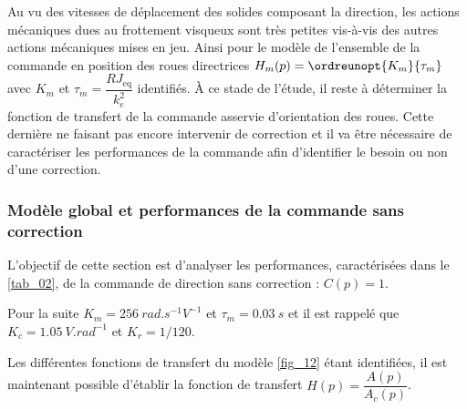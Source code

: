 Au vu des vitesses de déplacement des solides composant la direction, les actions mécaniques dues au frottement
visqueux sont très petites vis-à-vis des autres actions mécaniques mises en jeu. Ainsi pour le modèle de l’ensemble
de la commande en position des roues directrices $H_m(p) = \ordreunopt{K_m}{\tau_m}$ avec $K_m$ et $\tau_m = \dfrac{RJ_{\text{eq}}}{k_e^2}$ identifiés.
À ce stade de l’étude, il reste à déterminer la fonction de transfert de la commande asservie d’orientation des
roues. Cette dernière ne faisant pas encore intervenir de correction et il va être nécessaire de caractériser les
performances de la commande afin d’identifier le besoin ou non d’une correction.

\subsubsection{Modèle global et performances de la commande sans correction}
\begin{obj}
L’objectif de cette section est d’analyser les performances, caractérisées dans le \autoref{tab_02}, de
la commande de direction sans correction : $C(p)=1$.
\end{obj}
Pour la suite $K_m =\SI{256}{rad.s^{-1}V^{-1}}$ et $\tau_m = \SI{0,03}{s}$ et il est rappelé que $K_c = \SI{1,05}{V.rad^{-1}}$ et $K_r = 1/120$.

\ifprof
\begin{corrige}
\end{corrige}
\else
\fi

Les différentes fonctions de transfert du modèle \autoref{fig_12} étant identifiées, il est maintenant possible d’établir la fonction de transfert $H(p)=\dfrac{A(p)}{A_c(p)}$.

\ifprof
\begin{corrige}
\end{corrige}
\else
\fi

\ifprof
\begin{corrige}
\end{corrige}
\else
\fi

